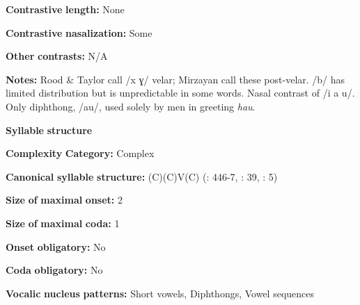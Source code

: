 \documentclass[output=paper]{langsci/langscibook}
\begin{document}
\begin{styleBody}
\textbf{Contrastive} \textbf{length:} None
\end{styleBody}

\begin{styleBody}
\textbf{Contrastive} \textbf{nasalization:} Some
\end{styleBody}

\begin{styleBody}
\textbf{Other} \textbf{contrasts:} N/A
\end{styleBody}

\begin{styleBody}
\textbf{Notes:} Rood \& Taylor call /x ɣ/ velar; Mirzayan call these post-velar. /b/ has limited distribution but is unpredictable in some words. Nasal contrast of /i a u/. Only diphthong, /au/, used solely by men in greeting \textit{hau}.
\end{styleBody}

\begin{styleBody}
\textbf{Syllable} \textbf{structure}
\end{styleBody}

\begin{styleBody}
\textbf{Complexity} \textbf{Category:} Complex
\end{styleBody}

\begin{styleBody}
\textbf{Canonical} \textbf{syllable} \textbf{structure:} (C)(C)V(C) (\citealt{TaylorRood1996}: 446-7, \citealt{Mirzayan2010}: 39, \citealt{Ingham2003}: 5)
\end{styleBody}

\begin{styleBody}
\textbf{Size} \textbf{of} \textbf{maximal} \textbf{onset:} 2
\end{styleBody}

\begin{styleBody}
\textbf{Size} \textbf{of} \textbf{maximal} \textbf{coda:} 1
\end{styleBody}

\begin{styleBody}
\textbf{Onset} \textbf{obligatory:} No
\end{styleBody}

\begin{styleBody}
\textbf{Coda} \textbf{obligatory:} No
\end{styleBody}

\begin{styleBody}
\textbf{Vocalic} \textbf{nucleus} \textbf{patterns:} Short vowels, Diphthongs, Vowel sequences
\end{styleBody}
\end{document}
